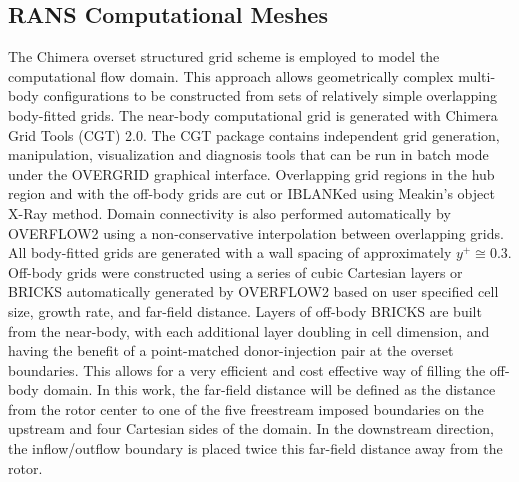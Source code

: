\subsection{RANS Computational Meshes}\label{section5-3-2}
The Chimera overset structured grid scheme is employed to model the computational flow domain. This approach allows geometrically complex multi-body configurations to be constructed from sets of relatively simple overlapping body-fitted grids.\cite{steger1983,chan2009} The near-body computational grid is generated with Chimera Grid Tools (CGT) 2.0.\cite{chan2002} The CGT package contains independent grid generation, manipulation, visualization and diagnosis tools that can be run in batch mode under the OVERGRID graphical interface.\cite{chan2002b} Overlapping grid regions in the hub region and with the off-body grids are cut or IBLANKed using Meakin's object X-Ray method.\cite{meakin2001} Domain connectivity is also performed automatically by OVERFLOW2 using a non-conservative interpolation between overlapping grids. All body-fitted grids are generated with a wall spacing of approximately $y^+\cong0.3$.\cite{chan2002c,bardina1997} Off-body grids were constructed using a series of cubic Cartesian layers or BRICKS \cite{meakin2001b} automatically generated by OVERFLOW2 based on user specified cell size, growth rate, and far-field distance. Layers of off-body BRICKS are built from the near-body, with each additional layer doubling in cell dimension, and having the benefit of a point-matched donor-injection pair at the overset boundaries. This allows for a very efficient and cost effective way of filling the off-body domain. In this work, the far-field distance will be defined as the distance from the rotor center to one of the five freestream imposed boundaries on the upstream and four Cartesian sides of the domain. In the downstream direction, the inflow/outflow boundary is placed twice this far-field distance away from the rotor. 



